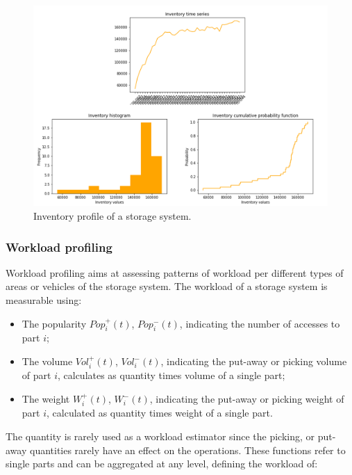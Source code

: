 \begin{figure}[hbt!]
\centering
\includegraphics[width=1.0\textwidth]{SectionWarehouses/control_figures/fig_inventory_profile.png}
\captionsetup{type=figure}
\caption{Inventory profile of a storage system.}
\label{fig_inventory_profile}
\end{figure}

\clearpage

\subsubsection{Workload profiling}
Workload profiling aims at assessing patterns of workload per different types of areas or vehicles of the storage system. The workload of a storage system is measurable using:

\begin{itemize}
    \item The popularity $Pop_i^+(t)$, $Pop_i^-(t)$, indicating the number of accesses to part $i$;
	\item The volume $Vol_i^+(t)$, $Vol_i^-(t)$, indicating the put-away or picking volume of part $i$, calculates as quantity times volume of a single part;
	\item The weight $W_i^+(t)$, $W_i^-(t)$, indicating the put-away or picking weight of part $i$, calculated as quantity times weight of a single part.

\end{itemize}

The quantity is rarely used as a workload estimator since the picking, or put-away quantities rarely have an effect on the operations. These functions refer to single parts and can be aggregated at any level, defining the workload of:

